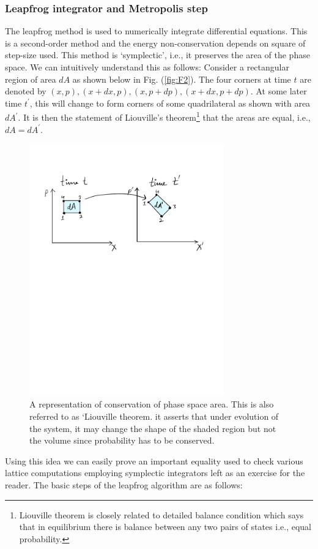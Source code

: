 \documentclass[11pt]{article}
\begin{document}
\subsubsection{Leapfrog integrator and Metropolis step}

The leapfrog method is used to numerically integrate differential equations. This is a second-order method and the energy non-conservation depends on square of step-size used. This method is `symplectic', i.e., it preserves the area of the phase space. 
We can intuitively understand this as follows: 
Consider a rectangular region of area $dA$ as shown below in Fig. (\ref{fig:F2}). The four corners at time $t$ are denoted by $(x, p), (x + dx, p), (x, p + dp), (x + dx, p + dp)$. At some later time $t^{\prime}$, this will change to form corners of some quadrilateral 
as shown with area $dA^{\prime}$. It is then the statement of Liouville's theorem\footnote{Liouville theorem is closely related to detailed balance condition which says that in equilibrium there is balance between any two pairs of states i.e., equal probability.} that the areas are equal, i.e., $dA = dA^{\prime}$. 
\begin{figure}[htbp] 
	\centering 
	\includegraphics[width=0.75\textwidth]{figs/PSP.pdf}
	\caption{\label{fig:F1}A representation of conservation of phase space area. This is also referred to as `Liouville theorem. it asserts that under evolution of the system, it may change the shape of the shaded region but not the volume since probability has to be conserved. }
\end{figure}
Using this idea we can easily prove an important equality used to check various lattice computations employing symplectic integrators left as an exercise for the reader. The basic steps of the leapfrog algorithm are as follows:
\end{document}
